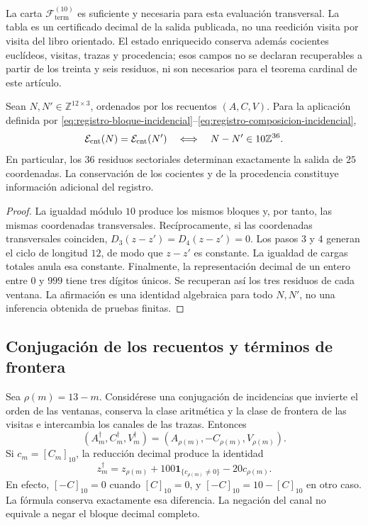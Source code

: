 La carta \(\mathscr F_{\mathrm{term}}^{(10)}\) es suficiente y necesaria
para esta evaluación transversal. La tabla es un certificado decimal de la
salida publicada, no una reedición visita por visita del libro orientado. El
estado enriquecido conserva además cocientes euclídeos, visitas, trazas y
procedencia; esos campos no se declaran recuperables a partir de los treinta y
seis residuos, ni son necesarios para el teorema cardinal de este artículo.

\begin{proposition}
\label{prop:registro-36-residuos}
Sean \(N,N'\in\mathbb Z^{12\times3}\), ordenados por los recuentos
\((A,C,V)\). Para la aplicación definida por
\eqref{eq:registro-bloque-incidencial}--\eqref{eq:registro-composicion-incidencial},
\[
 \mathcal E_{\rm cnt}(N)=\mathcal E_{\rm cnt}(N')
 \quad\Longleftrightarrow\quad
 N-N'\in10\mathbb Z^{36}.
\]
En particular, los \(36\) residuos sectoriales determinan exactamente
la salida de \(25\) coordenadas. La conservación de los cocientes y
de la procedencia constituye información adicional del registro.
\end{proposition}

\begin{proof}
La igualdad módulo \(10\) produce los mismos bloques y, por tanto,
las mismas coordenadas transversales. Recíprocamente, si las coordenadas
transversales coinciden, \(D_3(z-z')=D_4(z-z')=0\). Los pasos
\(3\) y \(4\) generan el ciclo de longitud \(12\), de modo que
\(z-z'\) es constante. La igualdad de cargas totales anula esa
constante. Finalmente, la representación decimal de un entero entre
\(0\) y \(999\) tiene tres dígitos únicos. Se recuperan así los
tres residuos de cada ventana. La afirmación es una identidad algebraica
para todo \(N,N'\), no una inferencia obtenida de pruebas finitas.
\end{proof}

\subsection{Conjugación de los recuentos y términos de frontera}
\label{subsec:registro-conjugacion-incidencial}

Sea \(\rho(m)=13-m\). Considérese una conjugación de incidencias
que invierte el orden de las ventanas, conserva la clase aritmética y la
clase de frontera de las visitas e intercambia los canales de las trazas.
Entonces
\[
 (A_m^\dagger,C_m^\dagger,V_m^\dagger)
 =(A_{\rho(m)},-C_{\rho(m)},V_{\rho(m)}).
\]
Si \(c_m=[C_m]_{10}\), la reducción decimal produce la identidad
\begin{equation}
 z_m^\dagger=z_{\rho(m)}
       +100\mathbf1_{\{c_{\rho(m)}\ne0\}}-20c_{\rho(m)}.
 \label{eq:registro-conjugacion-decimal}
\end{equation}
En efecto, \([-C]_{10}=0\) cuando \([C]_{10}=0\), y
\([-C]_{10}=10-[C]_{10}\) en otro caso. La fórmula conserva
exactamente esa diferencia. La negación del canal no equivale a negar
el bloque decimal completo.

